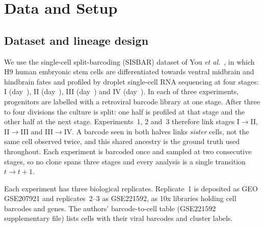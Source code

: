 

\section{Data and Setup}\label{sec:data}

\subsection{Dataset and lineage design}
We use the single-cell split-barcoding (SISBAR) dataset of You \emph{et al.}~\cite{You_2023},
in which H9 human embryonic stem cells are differentiated towards ventral midbrain and
hindbrain fates and profiled by droplet single-cell RNA sequencing at four stages:
I (day~\dayOne), II (day~\dayTwo), III (day~\dayThree) and IV (day~\dayFour). In each of
three experiments, progenitors are labelled with a retroviral barcode library at one
stage. After three to four divisions the culture is split: one half is profiled at that
stage and the other half at the next stage. Experiments~1, 2 and~3 therefore link
stages I$\to$II, II$\to$III and III$\to$IV. A barcode seen in both halves links
\emph{sister} cells, not the same cell observed twice, and this shared ancestry is the
ground truth used throughout. Each experiment is barcoded once and sampled at two
consecutive stages, so no clone spans three stages and every analysis is a single
transition $t\to t+1$.

Each experiment has three biological replicates. Replicate~1 is deposited as GEO
GSE207921 and replicates~2--3 as GSE221592, as \nLibraries{} 10x libraries holding
\nBarcodes{} cell barcodes and \nGenes{} genes. The authors' barcode-to-cell table
(GSE221592 supplementary file) lists \nCloneTableCells{} cells with their viral
barcodes and cluster labels.

